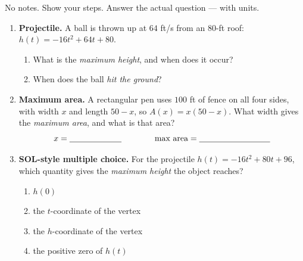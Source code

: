 \documentclass[10pt]{article}
\begin{document}

\vspace{0.12in}

No notes. Show your steps. Answer the actual question --- with units.

\begin{enumerate}[leftmargin=1.8em, itemsep=14pt]
  \item \textbf{Projectile.} A ball is thrown up at $64$ ft/s from an $80$-ft roof: $h(t)=-16t^2+64t+80$.
        \begin{enumerate}[label=(\alph*), leftmargin=1.9em, itemsep=4pt]
          \item What is the \emph{maximum height}, and when does it occur? \hfill \blank{4.2cm}
          \item When does the ball \emph{hit the ground}? \hfill \blank{3.2cm}
        \end{enumerate}

  \item \textbf{Maximum area.} A rectangular pen uses $100$ ft of fence on all four sides, with width $x$ and
        length $50-x$, so $A(x)=x(50-x)$. What width gives the \emph{maximum area}, and what is that area?
        \[ x=\blank{2.2cm} \qquad\qquad \text{max area}=\blank{3.0cm} \]

  \item \textbf{SOL-style multiple choice.} For the projectile $h(t)=-16t^2+80t+96$, which quantity gives the
        \emph{maximum height} the object reaches?
        \begin{enumerate}[label=\Alph*., leftmargin=1.9em, itemsep=1pt]
          \item $h(0)$
          \item the $t$-coordinate of the vertex
          \item the $h$-coordinate of the vertex
          \item the positive zero of $h(t)$
        \end{enumerate}
\end{enumerate}
\end{document}
